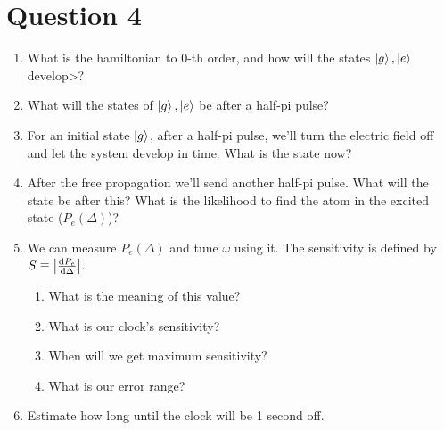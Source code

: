 \clearpage
\section{Question 4}

\begin{colbox}
	\begin{enumerate}
		\item What is the hamiltonian to 0-th order, and how will the states $\ket{g}, \ket{e}$ develop>?
		\item What will the states of $\ket{g}, \ket{e}$ be after a half-pi pulse?
		\item For an initial state $\ket{g}$, after a half-pi pulse, we'll turn the electric field off and let the system develop in time. What is the state now?
		\item After the free propagation we'll send another half-pi pulse. What will the state be after this? What is the likelihood to find the atom in the excited state ($P_e(\Delta)$)?
		\item We can measure $P_e(\Delta)$ and tune $\omega$ using it. The sensitivity is defined by $S\equiv\left\lvert\diff{P_e}{\Delta}\right\rvert$. \begin{enumerate}
			\item What is the meaning of this value?
			\item What is our clock's sensitivity?
			\item When will we get maximum sensitivity?
			\item What is our error range?
		\end{enumerate}
		\item Estimate how long until the clock will be 1 second off.
	\end{enumerate}
\end{colbox}


